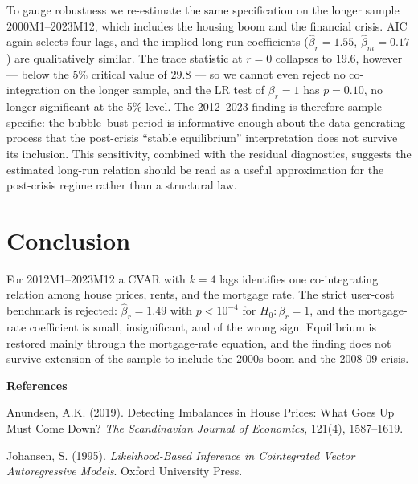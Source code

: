 \documentclass[12pt]{article}
\begin{document}
To gauge robustness we re-estimate the same specification on the longer sample 2000M1--2023M12, which includes the housing boom and the financial crisis. AIC again selects four lags, and the implied long-run coefficients ($\hat\beta_r=1.55$, $\hat\beta_m=0.17$) are qualitatively similar. The trace statistic at $r=0$ collapses to $19.6$, however --- below the 5\% critical value of $29.8$ --- so we cannot even reject no co-integration on the longer sample, and the LR test of $\beta_r=1$ has $p=0.10$, no longer significant at the 5\% level. The 2012--2023 finding is therefore sample-specific: the bubble--bust period is informative enough about the data-generating process that the post-crisis ``stable equilibrium'' interpretation does not survive its inclusion. This sensitivity, combined with the residual diagnostics, suggests the estimated long-run relation should be read as a useful approximation for the post-crisis regime rather than a structural law.

\section{Conclusion}\label{sec:p2-conclusion}

For 2012M1--2023M12 a CVAR with $k=4$ lags identifies one co-integrating relation among house prices, rents, and the mortgage rate. The strict user-cost benchmark is rejected: $\hat\beta_r=1.49$ with $p<10^{-4}$ for $H_0:\beta_r=1$, and the mortgage-rate coefficient is small, insignificant, and of the wrong sign. Equilibrium is restored mainly through the mortgage-rate equation, and the finding does not survive extension of the sample to include the 2000s boom and the 2008-09 crisis.

\bigskip
\noindent\textbf{References}

\noindent Anundsen, A.K. (2019). Detecting Imbalances in House Prices: What Goes Up Must Come Down? \textit{The Scandinavian Journal of Economics}, 121(4), 1587--1619.

\noindent Johansen, S. (1995). \textit{Likelihood-Based Inference in Cointegrated Vector Autoregressive Models}. Oxford University Press.


\newpage
\end{document}

